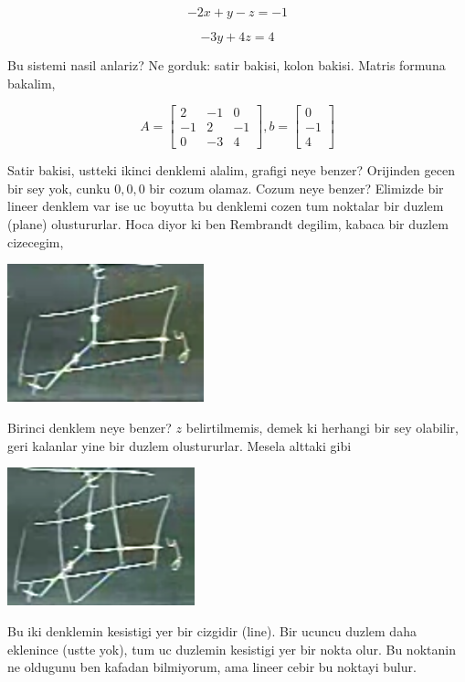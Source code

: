 \documentclass[12pt,fleqn]{article}\usepackage{../common}
\begin{document}
$$ -2x + y - z = -1 $$

$$ -3y + 4z = 4 $$

Bu sistemi nasil anlariz? Ne gorduk: satir bakisi, kolon bakisi. Matris
formuna bakalim, 

$$ A = 
\left[\begin{array}{rrr}
2 & -1 & 0 \\
-1 & 2 & -1 \\
0 & -3 & 4 
\end{array}\right]
,
b = 
\left[\begin{array}{r}
0  \\
-1 \\
4  
\end{array}\right]
 $$

Satir bakisi, ustteki ikinci denklemi alalim, grafigi neye benzer?
Orijinden gecen bir sey yok, cunku $0,0,0$ bir cozum olamaz. Cozum neye
benzer? Elimizde bir lineer denklem var ise uc boyutta bu denklemi cozen
tum noktalar bir duzlem (plane) olustururlar. Hoca diyor ki ben Rembrandt
degilim, kabaca bir duzlem cizecegim, 

\includegraphics[height=4cm]{1_06.png}

Birinci denklem neye benzer? $z$ belirtilmemis, demek ki herhangi bir sey
olabilir, geri kalanlar yine bir duzlem olustururlar. Mesela alttaki gibi

\includegraphics[height=4cm]{1_07.png}

Bu iki denklemin kesistigi yer bir cizgidir (line). Bir ucuncu duzlem daha
eklenince (ustte yok), tum uc duzlemin kesistigi yer bir nokta olur. Bu
noktanin ne oldugunu ben kafadan bilmiyorum, ama lineer cebir bu noktayi
bulur.
\end{document}
